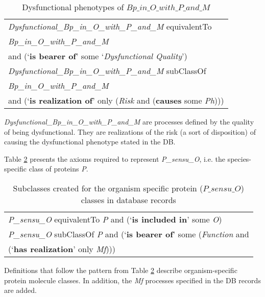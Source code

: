 \begin{table}[H]
	\caption{Dysfunctional phenotypes of $Bp\_in\_O\_with\_P\_and\_M$}
	\label{table:DysfunctionalBpComposite}
	\centering
	\begin{tabular}{p{3in}}
		\hline
		\textit{Dysfunctional\_Bp\_in\_O\_with\_P\_and\_M} equivalentTo \\ \hspace{0,5cm}\textit{Bp\_in\_O\_with\_P\_and\_M} \\
		\hspace{1cm} and (`\textbf{is bearer of}'  some `\textit{Dysfunctional Quality}') \\
		\textit{Dysfunctional\_Bp\_in\_O\_with\_P\_and\_M} subClassOf \\
		\hspace{0.5cm} \textit{Bp\_in\_O\_with\_P\_and\_M} \\
		\hspace{1cm} and (`\textbf{is realization of}' only (\textit{Risk} and (\textbf{causes}  some \textit{Ph}))) \\
		\hline
	\end{tabular}
\end{table}%
\noindent
\textit{Dysfunctional\_Bp\_in\_O\_with\_P\_and\_M} are processes defined by the quality of being dysfunctional. They are realizations of the risk (a sort of disposition) of causing the dysfunctional phenotype stated in the DB.

Table \ref{table:PComposite} presents the axioms required to represent \textit{P\_sensu\_O}, i.e. the species-specific class of proteins \textit{P}.

\begin{table}[H]
	\caption{Subclasses created for the organism specific protein ($P\_sensu\_O$) classes in database records}
	\label{table:PComposite}
	\centering
	\begin{tabular}{p{3in}}
		\hline
\textit{P\_sensu\_O} equivalentTo \textit{P} and (`\textbf{is included in}' some \textit{O}) \\
\textit{P\_sensu\_O} subClassOf \textit{P} and (`\textbf{is bearer of}'  some (\textit{Function} and \\			
\hspace{1cm} (`\textbf{has realization}' only \textit{Mf}))) \\
		\hline
	\end{tabular}
\end{table}%
\noindent
Definitions that follow the pattern from Table \ref{table:PComposite} describe organism-specific protein molecule classes. In addition, the \textit{Mf} processes specified in the DB records are added. 


